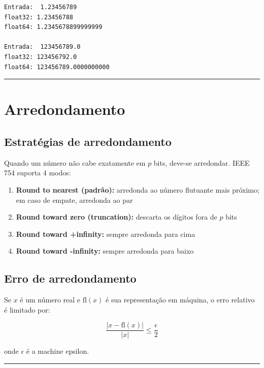 \documentclass[
  11pt,
  letterpaper,
  DIV=11,
  numbers=noendperiod]{scrartcl}
\providecommand{\tightlist}{%
  \setlength{\itemsep}{0pt}\setlength{\parskip}{0pt}}
\begin{document}
\begin{verbatim}
Entrada:  1.23456789
float32: 1.23456788
float64: 1.2345678899999999

Entrada:  123456789.0
float32: 123456792.0
float64: 123456789.0000000000
\end{verbatim}

\begin{center}\rule{0.5\linewidth}{0.5pt}\end{center}

\section{Arredondamento}\label{arredondamento}

\subsection{Estratégias de
arredondamento}\label{estratuxe9gias-de-arredondamento}

Quando um número não cabe exatamente em \(p\) bits, deve-se arredondar.
IEEE 754 suporta 4 modos:

\begin{enumerate}
\def\labelenumi{\arabic{enumi}.}
\tightlist
\item
  \textbf{Round to nearest (padrão):} arredonda ao número flutuante mais
  próximo; em caso de empate, arredonda ao par
\item
  \textbf{Round toward zero (truncation):} descarta os dígitos fora de
  \(p\) bits
\item
  \textbf{Round toward +infinity:} sempre arredonda para cima
\item
  \textbf{Round toward -infinity:} sempre arredonda para baixo
\end{enumerate}

\subsection{Erro de arredondamento}\label{erro-de-arredondamento}

Se \(x\) é um número real e \(\text{fl}(x)\) é sua representação em
máquina, o erro relativo é limitado por:

\[\frac{|x - \text{fl}(x)|}{|x|} \leq \frac{\epsilon}{2}\]

onde \(\epsilon\) é a machine epsilon.

\begin{center}\rule{0.5\linewidth}{0.5pt}\end{center}
\end{document}
